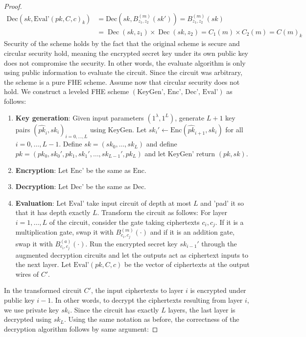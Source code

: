 \begin{proof}
\begin{equation*}
    \begin{aligned}
    \text{Dec}(sk, \text{Eval'}(pk, C, c)_k) &= \text{Dec}(sk, B_{z_1,z_2}^{(m)}(sk')) = B_{z_1,z_2}^{(m)}(sk) \\
    &= \operatorname{Dec}(sk, z_1) \times \operatorname{Dec}(sk, z_2) = C_1(m) \times C_2(m) = C(m)_k
    \end{aligned}
\end{equation*}
Security of the scheme holds by the fact that the original scheme is secure and circular security hold, meaning the encrypted secret key under its own public key does not compromise the security. In other words, the evaluate algorithm is only using public information to evaluate the circuit. Since the circuit was arbitrary, the scheme is a pure FHE scheme.
Assume now that circular security does not hold. We construct a leveled FHE scheme $(\text{KeyGen', Enc', Dec', Eval'})$ as follows:
    \begin{enumerate}
        \item \textbf{Key generation}: Given input parameters $(1^{\lambda}, 1^L)$, generate $L+1$ key pairs $(\hat{pk}_i,sk_i)_{i = 0, \dots, L}$ using $\text{KeyGen}$. Let $sk_i' \leftarrow \text{Enc}(\hat{pk}_{i+1},sk_i)$ for all $i = 0, \dots, L-1$. Define $sk = (sk_0, \dots, sk_L)$ and define $pk = (pk_0, sk_0', pk_1, sk_1', \dots, sk_{L-1}', pk_L)$ and let $\text{KeyGen'}$ return $(pk,sk)$.
        \item \textbf{Encryption}: Let $\text{Enc'}$ be the same as $\text{Enc}$.
        \item \textbf{Decryption}: Let $\text{Dec'}$ be the same as $\text{Dec}$.
        \item \textbf{Evaluation}: Let $\text{Eval'}$ take input circuit of depth at most $L$ and 'pad' it so that it has depth exactly $L$. Transform the circuit as follows: For layer $i = 1, \dots, L$ of the circuit, consider the gate taking ciphertexts $c_i, c_j$. If it is a multiplication gate, swap it with $B_{c_i,c_j}^{(m)}(\cdot)$ and if it is an addition gate, swap it with $B_{c_i,c_j}^{(a)}(\cdot)$. Run the encrypted secret key $sk_{i-1}'$ through the augmented decryption circuits and let the outputs act as ciphertext inputs to the next layer. Let $\text{Eval'}(pk, C, c)$ be the vector of ciphertexts at the output wires of $C'$.
    \end{enumerate}
In the transformed circuit $C'$, the input ciphertexts to layer $i$ is encrypted under public key $i-1$. In other words, to decrypt the ciphertexts resulting from layer $i$, we use private key $sk_i$. Since the circuit has exactly $L$ layers, the last layer is decrypted using $sk_L$. Using the same notation as before, the correctness of the decryption algorithm follows by same argument:

\end{proof}

